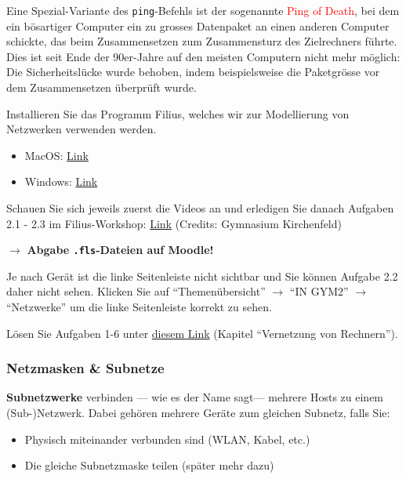 \begin{mycaution}
Eine Spezial-Variante des \texttt{ping}-Befehls ist der sogenannte \textcolor{red}{\faSkull{} Ping of Death}, bei dem ein bösartiger Computer ein zu grosses Datenpaket an einen anderen Computer schickte, das beim Zusammensetzen zum Zusammensturz des Zielrechners führte. Dies ist seit Ende der 90er-Jahre auf den meisten Computern nicht mehr möglich: Die Sicherheitslücke wurde behoben, indem beispielsweise die Paketgrösse vor dem Zusammensetzen überprüft wurde.
\end{mycaution}

\begin{myexercise}
Installieren Sie das Programm Filius, welches wir zur Modellierung von Netzwerken verwenden werden.
\begin{itemize}
\item MacOS: \href{https://moodle.ksimlee.ch/pluginfile.php/58667/mod_resource/content/1/Anleitung%20Filius.pdf}{Link}
\item Windows: \href{https://informatik.mygymer.ch/base/?page=network/2-filius/windows/}{Link}
\end{itemize}
\end{myexercise}

\begin{mysubmission}
Schauen Sie sich jeweils zuerst die Videos an und erledigen Sie danach Aufgaben 2.1 - 2.3 im Filius-Workshop: \href{https://informatik.mygymer.ch/base/?page=network/2-filius/1-peer/}{Link} (Credits: Gymnasium Kirchenfeld)

$\rightarrow$ \textbf{Abgabe \texttt{.fls}-Dateien auf Moodle!}
\begin{mycaution}
Je nach Gerät ist die linke Seitenleiste nicht sichtbar und Sie können Aufgabe 2.2 daher nicht sehen. Klicken Sie auf ``Themenübersicht'' $\rightarrow$  ``IN GYM2'' $\rightarrow$ ``Netzwerke'' um die linke Seitenleiste korrekt zu sehen.
\end{mycaution}
\end{mysubmission}

\begin{mychallenge}
Lösen Sie Aufgaben 1-6 unter \href{https://inf-schule.de/rechnernetze/filius/vernetzungrechner/erkundung_zweirechner}{diesem Link} (Kapitel ``Vernetzung von Rechnern'').
\end{mychallenge}


\subsubsection{Netzmasken \& Subnetze}
\textbf{Subnetzwerke} verbinden --- wie es der Name sagt--- mehrere Hosts zu einem (Sub-)Netzwerk. Dabei gehören mehrere Geräte zum gleichen Subnetz, falls Sie:
\begin{itemize}
\item Physisch miteinander verbunden sind (WLAN, Kabel, etc.)
\item Die gleiche Subnetzmaske teilen (später mehr dazu)
\end{itemize}

